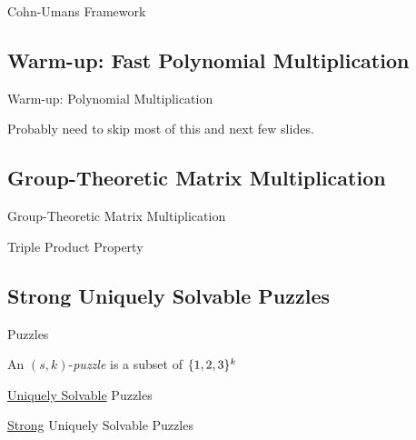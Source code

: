\documentclass[t,10pt,
mathserif,xcolor=dvipsnames]{beamer}
\begin{document}
\begin{myframe}{Cohn-Umans Framework}

\end{myframe}

\subsection{Warm-up: Fast Polynomial Multiplication}

\begin{myframe}{Warm-up: Polynomial Multiplication}

  Probably need to skip most of this and next few slides.
  
\end{myframe}

\subsection{Group-Theoretic Matrix Multiplication}

\begin{myframe}{Group-Theoretic Matrix Multiplication}

\end{myframe}

\begin{myframe}{Triple Product Property}

\end{myframe}

\subsection{Strong Uniquely Solvable Puzzles}

\begin{myframe}{Puzzles}

  \begin{definition}[Puzzle]
    An $(s,k)$-\emph{puzzle} is a subset of $\{{1,2,3}\}^k$
  \end{definition}
  
\end{myframe}

\begin{myframe}{\uline{Uniquely Solvable} Puzzles}

\end{myframe}

\begin{myframe}{\uline{Strong} Uniquely Solvable Puzzles}

\end{myframe}
\end{document}
